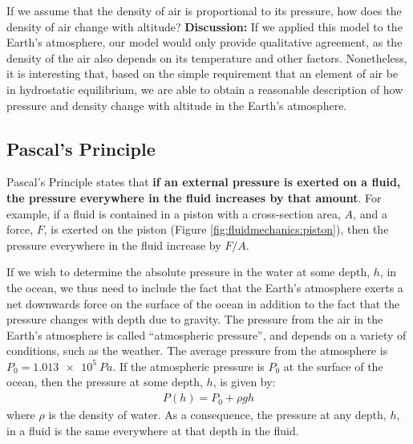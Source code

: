 \begin{example}{If we assume that the density of air is proportional to its pressure, how does the density of air change with altitude?}
\textbf{Discussion:} If we applied this model to the Earth's atmosphere, our model would only provide qualitative agreement, as the density of the air also depends on its temperature and other factors. Nonetheless, it is interesting that, based on the simple requirement that an element of air be in hydrostatic equilibrium, we are able to obtain a reasonable description of how pressure and density change with altitude in the Earth's atmosphere.
\end{example}

\subsection{Pascal's Principle}
Pascal's Principle states that \textbf{if an external pressure is exerted on a fluid, the pressure everywhere in the fluid increases by that amount}. For example, if a fluid is contained in a piston with a cross-section area, $A$, and a force, $F$, is exerted on the piston (Figure \ref{fig:fluidmechanics:piston}), then the pressure everywhere in the fluid increase by $F/A$. 

If we wish to determine the absolute pressure in the water at some depth, $h$, in the ocean, we thus need to include the fact that the Earth's atmosphere exerts a net downwards force on the surface of the ocean in addition to the fact that the pressure changes with depth due to gravity. The pressure from the air in the Earth's atmosphere is called ``atmospheric pressure'', and depends on a variety of conditions, such as the weather. The average pressure from the atmosphere is $P_0=\SI{1.013e5}{Pa}$. If the atmospheric pressure is $P_0$ at the surface of the ocean, then the pressure at some depth, $h$, is given by:
\begin{align*}
P(h) = P_0 + \rho g h
\end{align*}
where $\rho$ is the density of water. As a consequence, the pressure at any depth, $h$, in a fluid is the same everywhere at that depth in the fluid. 

